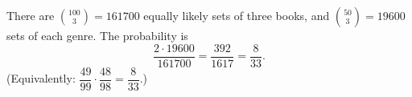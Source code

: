 There are $\binom{100}{3}=161700$ equally likely sets of three books, and $\binom{50}{3}=19600$ sets of each genre. The probability is
\[
\dfrac{2\cdot19600}{161700}=\dfrac{392}{1617}=\boxed{\dfrac{8}{33}} .
\]
(Equivalently: $\dfrac{49}{99}\cdot\dfrac{48}{98}=\dfrac{8}{33}$.)
